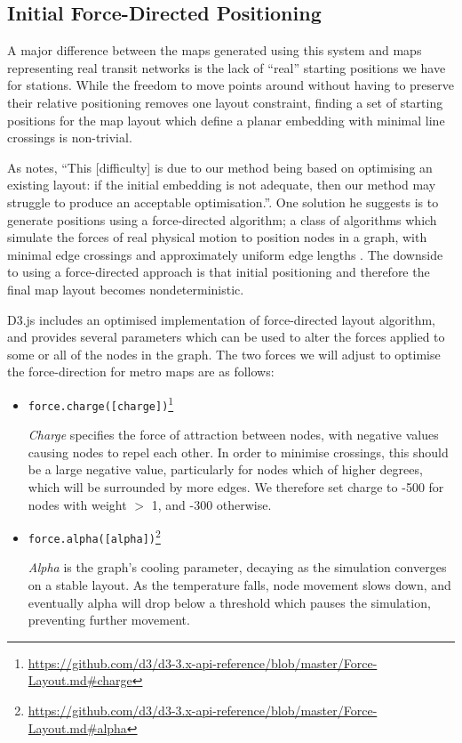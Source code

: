 \subsection{Initial Force-Directed Positioning} \label{sec:fdp}

A major difference between the maps generated using this system and maps representing real transit networks is the lack of ``real'' starting positions we have for stations. While the freedom to move points around without having to preserve their relative positioning removes one layout constraint, finding a set of starting positions for the map layout which define a planar embedding with minimal line crossings is non-trivial. 

As \citeauthor{AutomaticMetroMapLayoutThesis} notes, ``This [difficulty] is due to our method being based on optimising an existing layout: if the initial embedding is not adequate, then our method may struggle to produce an acceptable optimisation.''\cite[p.210]{AutomaticMetroMapLayoutThesis}. One solution he suggests is to generate positions using a force-directed algorithm; a class of algorithms which simulate the forces of real physical motion to position nodes in a graph, with minimal edge crossings and approximately uniform edge lengths \citep{springembedders}. The downside to using a force-directed approach is that initial positioning and therefore the final map layout becomes nondeterministic. 

D3.js includes an optimised implementation of  force-directed layout algorithm, and provides several parameters which can be used to alter the forces applied to some or all of the nodes in the graph. The two forces we will adjust to optimise the force-direction for metro maps are as follows:
\begin{itemize}
\item\texttt{force.charge([charge])}\footnote{\url{https://github.com/d3/d3-3.x-api-reference/blob/master/Force-Layout.md\#charge}}\par
	\textit{Charge} specifies the force of attraction between nodes, with negative values causing nodes to repel each other. In order to minimise crossings, this should be a large negative value, particularly for nodes which of higher degrees, which will be surrounded by more edges. We therefore set charge to -500 for nodes with weight $>$ 1, and -300 otherwise. 

\item\texttt{force.alpha([alpha])}\footnote{\url{https://github.com/d3/d3-3.x-api-reference/blob/master/Force-Layout.md\#alpha}}\par
	\textit{Alpha} is the graph's cooling parameter, decaying as the simulation converges on a stable layout. As the temperature falls, node movement slows down, and eventually alpha will drop below a threshold which pauses the simulation, preventing further movement. 
\end{itemize}

